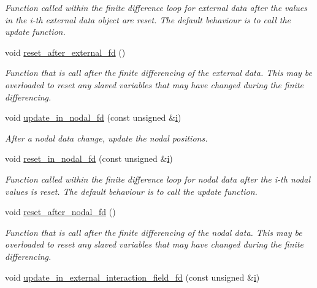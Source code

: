 \begin{DoxyCompactItemize}
\begin{DoxyCompactList}\small\item\em Function called within the finite difference loop for external data after the values in the i-\/th external data object are reset. The default behaviour is to call the update function. \end{DoxyCompactList}\item 
void \hyperlink{classoomph_1_1FSIWallElement_a2b1dc28716968b01e7bf5513ea4446c5}{reset\+\_\+after\+\_\+external\+\_\+fd} ()
\begin{DoxyCompactList}\small\item\em Function that is call after the finite differencing of the external data. This may be overloaded to reset any slaved variables that may have changed during the finite differencing. \end{DoxyCompactList}\item 
void \hyperlink{classoomph_1_1FSIWallElement_adcde92f149843f4a68dffec420b54c6c}{update\+\_\+in\+\_\+nodal\+\_\+fd} (const unsigned \&\hyperlink{cfortran_8h_adb50e893b86b3e55e751a42eab3cba82}{i})
\begin{DoxyCompactList}\small\item\em After a nodal data change, update the nodal positions. \end{DoxyCompactList}\item 
void \hyperlink{classoomph_1_1FSIWallElement_afb13bbbad0afbf83b45bac82ac7f50b5}{reset\+\_\+in\+\_\+nodal\+\_\+fd} (const unsigned \&\hyperlink{cfortran_8h_adb50e893b86b3e55e751a42eab3cba82}{i})
\begin{DoxyCompactList}\small\item\em Function called within the finite difference loop for nodal data after the i-\/th nodal values is reset. The default behaviour is to call the update function. \end{DoxyCompactList}\item 
void \hyperlink{classoomph_1_1FSIWallElement_a24734c8730cf96234ee2317dd123b19e}{reset\+\_\+after\+\_\+nodal\+\_\+fd} ()
\begin{DoxyCompactList}\small\item\em Function that is call after the finite differencing of the nodal data. This may be overloaded to reset any slaved variables that may have changed during the finite differencing. \end{DoxyCompactList}\item 
void \hyperlink{classoomph_1_1FSIWallElement_ab427113ed6de36a5e8458e67eac7b6b4}{update\+\_\+in\+\_\+external\+\_\+interaction\+\_\+field\+\_\+fd} (const unsigned \&\hyperlink{cfortran_8h_adb50e893b86b3e55e751a42eab3cba82}{i})

\end{DoxyCompactItemize}
